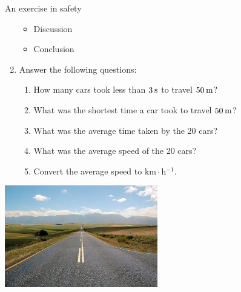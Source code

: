 \begin{Investigation}{An exercise in safety }
\begin{enumerate}[noitemsep, label=\textbf{\arabic*}. ]
\begin{itemize}[noitemsep]
\label{m38791*uid70}\item Discussion
\label{m38791*uid71}\item Conclusion
\end{itemize}
        \label{m38791*uid72}\item Answer the following questions:
\label{m38791*id67432}\begin{enumerate}[noitemsep, label=\textbf{\alph*}. ] 
            \label{m38791*uid73}\item How many cars took less than $3\phantom{\rule{2pt}{0ex}}\text{s}$ to travel $50\phantom{\rule{2pt}{0ex}}\text{m}$?
\label{m38791*uid74}\item What was the shortest time a car took to travel $50\phantom{\rule{2pt}{0ex}}\text{m}$?
\label{m38791*uid75}\item What was the average time taken by the 20 cars?
\label{m38791*uid76}\item What was the average speed of the 20 cars?
\label{m38791*uid77}\item Convert the average speed to $\text{km}\ensuremath{\cdot}\text{h}{}^{-1}$.
\end{enumerate}
        \end{enumerate}
\begin{center}
\includegraphics[width=0.5\textwidth]{photos/roadby_cornstaruk_flickr.jpg}
\end{center}
\end{Investigation}
  \label{m38791**end}
